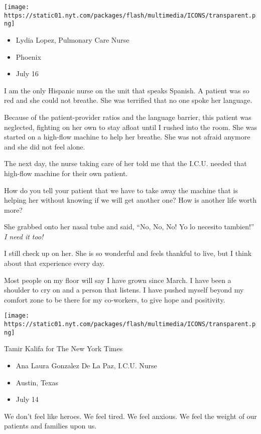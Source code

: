 \texttt{[image: https://static01.nyt.com/packages/flash/multimedia/ICONS/transparent.png]}

\begin{itemize}
\tightlist
\item
  Lydia Lopez, Pulmonary Care Nurse
\item
  Phoenix
\item
  July 16
\end{itemize}

I am the only Hispanic nurse on the unit that speaks Spanish. A patient
was so red and she could not breathe. She was terrified that no one
spoke her language.

Because of the patient-provider ratios and the language barrier, this
patient was neglected, fighting on her own to stay afloat until I rushed
into the room. She was started on a high-flow machine to help her
breathe. She was not afraid anymore and she did not feel alone.

The next day, the nurse taking care of her told me that the I.C.U.
needed that high-flow machine for their own patient.

How do you tell your patient that we have to take away the machine that
is helping her without knowing if we will get another one? How is
another life worth more?

She grabbed onto her nasal tube and said, ``No, No, No! Yo lo necesito
tambien!'' \emph{I need it too!}

I still check up on her. She is so wonderful and feels thankful to live,
but I think about that experience every day.

Most people on my floor will say I have grown since March. I have been a
shoulder to cry on and a person that listens. I have pushed myself
beyond my comfort zone to be there for my co-workers, to give hope and
positivity.

\texttt{[image: https://static01.nyt.com/packages/flash/multimedia/ICONS/transparent.png]}

Tamir Kalifa for The New York Times

\begin{itemize}
\tightlist
\item
  Ana Laura Gonzalez De La Paz, I.C.U. Nurse
\item
  Austin, Texas
\item
  July 14
\end{itemize}

We don't feel like heroes. We feel tired. We feel anxious. We feel the
weight of our patients and families upon us.

